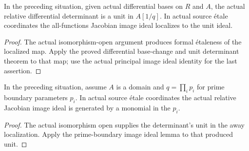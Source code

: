 \begin{lemma}\label{lem:sc0-jacobian-unit-from-iso-open}
\leanok
{}
In the preceding situation, given actual differential bases on $R$ and $A$, the
actual relative differential determinant is a unit in $A[1/q]$. In actual source
\'etale coordinates the all-functions Jacobian image ideal localizes to the unit
ideal.
\end{lemma}
\begin{proof}
The actual isomorphism-open argument produces formal \'etaleness of the localized
map. Apply the proved differential base-change and unit determinant theorem to
that map; use the actual principal image ideal identity for the last assertion.
\end{proof}


\begin{corollary}\label{cor:sc0-prime-boundary-jacobian-from-iso}
\leanok
{}
In the preceding situation, assume $A$ is a domain and $q=\prod_i p_i$ for prime
boundary parameters $p_i$. In actual source \'etale coordinates the actual
relative Jacobian image ideal is generated by a monomial in the $p_i$.
\end{corollary}
\begin{proof}
The actual isomorphism open supplies the determinant's unit in the away
localization. Apply the prime-boundary image ideal lemma to that produced unit.
\end{proof}
